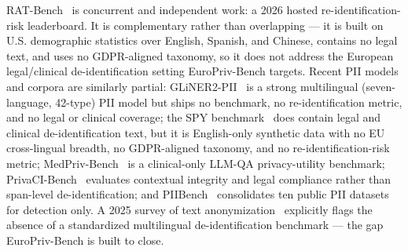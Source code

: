 \documentclass[11pt]{article}
\begin{document}
RAT-Bench~\cite{ratbench2026} is concurrent and independent work: a 2026 hosted
re-identification-risk leaderboard. It is complementary rather than overlapping --- it is built on
U.S. demographic statistics over English, Spanish, and Chinese, contains no legal text, and uses no
GDPR-aligned taxonomy, so it does not address the European legal/clinical de-identification setting
EuroPriv-Bench targets. Recent PII models and corpora are similarly partial: GLiNER2-PII~\cite{gliner2pii2026}
is a strong multilingual (seven-language, 42-type) PII model but ships no benchmark, no
re-identification metric, and no legal or clinical coverage; the SPY benchmark~\cite{spy2025}
does contain legal and clinical de-identification text, but it is English-only synthetic data with
no EU cross-lingual breadth, no GDPR-aligned taxonomy, and no re-identification-risk metric;
MedPriv-Bench~\cite{medprivbench2026} is a clinical-only LLM-QA privacy-utility benchmark;
PrivaCI-Bench~\cite{privacibench2025} evaluates contextual integrity and legal compliance rather than
span-level de-identification; and PIIBench~\cite{piibench2026} consolidates ten public PII datasets
for detection only. A 2025 survey of text anonymization~\cite{deusser2025survey} explicitly flags
the absence of a standardized multilingual de-identification benchmark --- the gap EuroPriv-Bench
is built to close.
\end{document}
